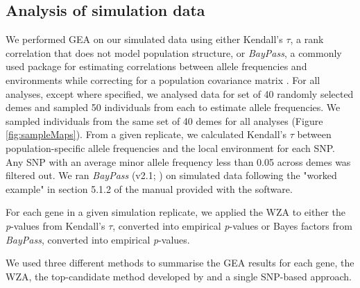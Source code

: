 \documentclass[10pt,twoside,lineno, twocolumn]{GSA_format}
\begin{document}


\subsection{Analysis of simulation data}

We performed GEA on our simulated data using either Kendall's $\tau$, a rank correlation that does not model population structure, or \textit{BayPass}, a commonly used package for estimating correlations between allele frequencies and environments while correcting for a population covariance matrix \citep{Gautier2015}. For all analyses, except where specified, we analysed data for set of 40 randomly selected demes and sampled 50 individuals from each to estimate allele frequencies. We sampled individuals from the same set of 40 demes for all analyses (Figure \ref{fig:sampleMaps}). From a given replicate, we calculated Kendall's $\tau$ between population-specific allele frequencies and the local environment for each SNP. Any SNP with an average minor allele frequency less than 0.05 across demes was filtered out. We ran \textit{BayPass} (v2.1; \citealt{Gautier2015}) on simulated data following the "worked example" in section 5.1.2 of the manual provided with the software. 

For each gene in a given simulation replicate, we applied the WZA to either the \textit{p}-values from Kendall's $\tau$, converted into empirical \textit{p}-values or Bayes factors from \textit{BayPass}, converted into empirical \textit{p}-values. 

We used three different methods to summarise the GEA results for each gene, the WZA, the top-candidate method developed by \cite{Yeaman2016} and a single SNP-based approach.
\end{document}
